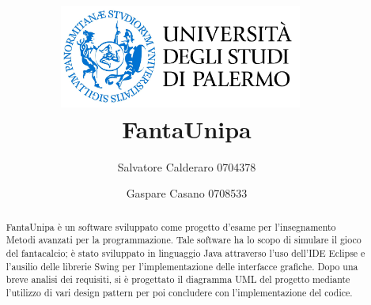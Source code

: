 \documentclass[12pt,a4paper]{article}
\title{%
\includegraphics[width=0.6\textwidth]{unipa.jpg}{\centering}~
\\[2cm]
FantaUnipa
\\[2cm]
}
\author{Salvatore Calderaro 0704378 \and Gaspare Casano 0708533}
\begin{document}
\date  {}
\maketitle
\thispagestyle{empty}
\newpage
\tableofcontents
\newpage
{}
\begin{abstract} 
FantaUnipa è un software sviluppato come progetto d'esame per l'insegnamento Metodi avanzati per la programmazione. Tale software ha lo scopo di simulare il gioco del fantacalcio; è stato sviluppato in linguaggio Java attraverso l'uso dell'IDE Eclipse e l'ausilio delle librerie Swing per l'implementazione delle interfacce grafiche. Dopo una breve analisi dei requisiti, si è progettato il diagramma UML del progetto mediante l'utilizzo di vari design pattern per poi concludere con l'implementazione del codice.
\end{abstract}
\newpage
{}
\end{document}

